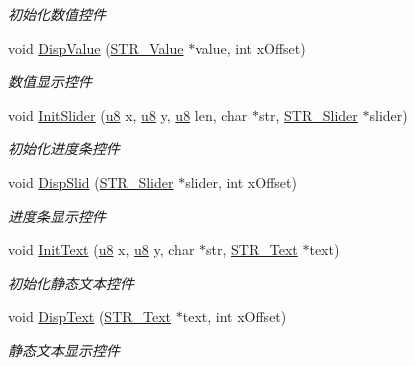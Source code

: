 \begin{DoxyCompactItemize}
\begin{DoxyCompactList}\small\item\em 初始化数值控件 \end{DoxyCompactList}\item 
void \hyperlink{group___w_i_d_g_e_t_gaf4e0de6239412535e03e36cd804c57b0}{\-Disp\-Value} (\hyperlink{struct_s_t_r___value}{\-S\-T\-R\-\_\-\-Value} $\ast$value, int x\-Offset)
\begin{DoxyCompactList}\small\item\em 数值显示控件 \end{DoxyCompactList}\item 
void \hyperlink{group___w_i_d_g_e_t_ga612551bd76b7c4640906e50cb9ee5f1e}{\-Init\-Slider} (\hyperlink{group___b_s_p_gaed742c436da53c1080638ce6ef7d13de}{u8} x, \hyperlink{group___b_s_p_gaed742c436da53c1080638ce6ef7d13de}{u8} y, \hyperlink{group___b_s_p_gaed742c436da53c1080638ce6ef7d13de}{u8} len, char $\ast$str, \hyperlink{struct_s_t_r___slider}{\-S\-T\-R\-\_\-\-Slider} $\ast$slider)
\begin{DoxyCompactList}\small\item\em 初始化进度条控件 \end{DoxyCompactList}\item 
void \hyperlink{group___w_i_d_g_e_t_ga6dce8af29d9d4e96029624f8d21af519}{\-Disp\-Slid} (\hyperlink{struct_s_t_r___slider}{\-S\-T\-R\-\_\-\-Slider} $\ast$slider, int x\-Offset)
\begin{DoxyCompactList}\small\item\em 进度条显示控件 \end{DoxyCompactList}\item 
void \hyperlink{group___w_i_d_g_e_t_gac18895bdc14f553f346c2b01e6fcc119}{\-Init\-Text} (\hyperlink{group___b_s_p_gaed742c436da53c1080638ce6ef7d13de}{u8} x, \hyperlink{group___b_s_p_gaed742c436da53c1080638ce6ef7d13de}{u8} y, char $\ast$str, \hyperlink{struct_s_t_r___text}{\-S\-T\-R\-\_\-\-Text} $\ast$text)
\begin{DoxyCompactList}\small\item\em 初始化静态文本控件 \end{DoxyCompactList}\item 
void \hyperlink{group___w_i_d_g_e_t_ga9684de3b62426e0d486fbdebe0e759ed}{\-Disp\-Text} (\hyperlink{struct_s_t_r___text}{\-S\-T\-R\-\_\-\-Text} $\ast$text, int x\-Offset)
\begin{DoxyCompactList}\small\item\em 静态文本显示控件 \end{DoxyCompactList}\end{DoxyCompactItemize}
